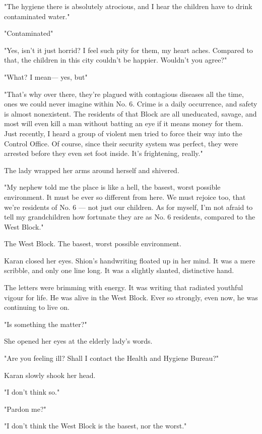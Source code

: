 "The hygiene there is absolutely atrocious, and I hear the children have
to drink contaminated water."

"Contaminated\el "

"Yes, isn't it just horrid? I feel such pity for them, my heart aches.
Compared to that, the children in this city couldn't be happier.
Wouldn't you agree?"

"What? I mean--- yes, but\el "

"That's why over there, they're plagued with contagious diseases all the
time, ones we could never imagine within No. 6. Crime is a daily
occurrence, and safety is almost nonexistent. The residents of that
Block are all uneducated, savage, and most will even kill a man without
batting an eye if it means money for them. Just recently, I heard a
group of violent men tried to force their way into the Control Office.
Of course, since their security system was perfect, they were arrested
before they even set foot inside. It's frightening, really."

The lady wrapped her arms around herself and shivered.

"My nephew told me the place is like a hell, the basest, worst possible
environment. It must be ever so different from here. We must rejoice
too, that we're residents of No. 6 --- not just our children. As for
myself, I'm not afraid to tell my grandchildren how fortunate they are
as No. 6 residents, compared to the West Block."

The West Block. The basest, worst possible environment.

Karan closed her eyes. Shion's handwriting floated up in her mind. It
was a mere scribble, and only one line long. It was a slightly slanted,
distinctive hand.


The letters were brimming with energy. It was writing that radiated
youthful vigour for life. He was alive in the West Block. Ever so
strongly, even now, he was continuing to live on.

"Is something the matter?"

She opened her eyes at the elderly lady's words.

"Are you feeling ill? Shall I contact the Health and Hygiene Bureau?"

Karan slowly shook her head.

"I don't think so."

"Pardon me?"

"I don't think the West Block is the basest, nor the worst."

